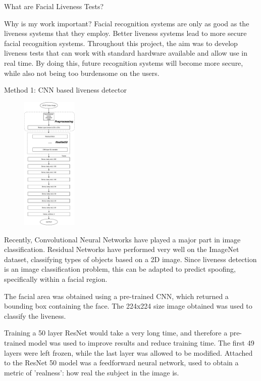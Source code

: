 \documentclass[final]{beamer}
\begin{document}
\begin{frame}{}
\begin{columns}[t]
\begin{column}{.48\linewidth}
\begin{block}{What are Facial Liveness Tests?}
        \end{block}
        \begin{block}{Why is my work important?}
          Facial recognition systems are only as good as the liveness systems that they employ. Better liveness systems lead to more secure facial recognition systems. Throughout this project, the aim was to develop liveness tests that can work with standard hardware available and allow use in real time. By doing this, future recognition systems will become more secure, while also not being too burdensome on the users. 
        \end{block}

        \begin{block}{Method 1: CNN based liveness detector}
          \begin{figure}
            \includegraphics[width=100px]{2DCNNArchitecture.pdf}
          \end{figure}
          Recently, Convolutional Neural Networks have played a major part in image classification. Residual Networks have performed very well on the ImageNet dataset, classifying types of objects based on a 2D image. Since liveness detection is an image classification problem, this can be adapted to predict spoofing, specifically within a facial region.
     
          The facial area was obtained using a pre-trained CNN, which returned a bounding box containing the face. The 224x224 size image obtained was used to classify the liveness.

          Training a 50 layer ResNet would take a very long time, and therefore a pre-trained model was used to improve results and reduce training time. The first 49 layers were left frozen, while the last layer was allowed to be modified. Attached to the ResNet 50 model was a feedforward neural network, used to obtain a metric of 'realness': how real the subject in the image is.



\end{block}
\end{column}
\end{columns}
\end{frame}
\end{document}
